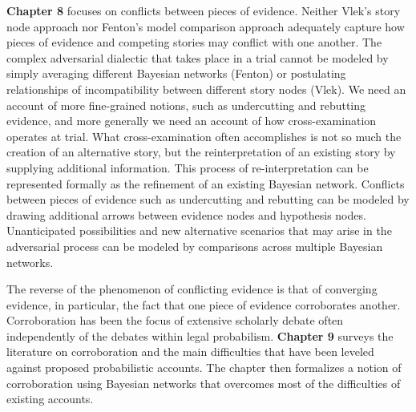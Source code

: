 \documentclass[
  10pt,
  dvipsnames,enabledeprecatedfontcommands]{scrartcl}
\begin{document}
\textbf{Chapter 8} focuses on conflicts between pieces of evidence.
Neither Vlek's story node approach nor Fenton's model comparison
approach adequately capture how pieces of evidence and competing stories
may conflict with one another. The complex adversarial dialectic that
takes place in a trial cannot be modeled by simply averaging different
Bayesian networks (Fenton) or postulating relationships of
incompatibility between different story nodes (Vlek). We need an account
of more fine-grained notions, such as undercutting and rebutting
evidence, and more generally we need an account of how cross-examination
operates at trial. What cross-examination often accomplishes is not so
much the creation of an alternative story, but the reinterpretation of
an existing story by supplying additional information. This process of
re-interpretation can be represented formally as the refinement of an
existing Bayesian network. Conflicts between pieces of evidence such as
undercutting and rebutting can be modeled by drawing additional arrows
between evidence nodes and hypothesis nodes. Unanticipated possibilities
and new alternative scenarios that may arise in the adversarial process
can be modeled by comparisons across multiple Bayesian networks.

The reverse of the phenomenon of conflicting evidence is that of
converging evidence, in particular, the fact that one piece of evidence
corroborates another. Corroboration has been the focus of extensive
scholarly debate often independently of the debates within legal
probabilism. \textbf{Chapter 9} surveys the literature on corroboration
and the main difficulties that have been leveled against proposed
probabilistic accounts. The chapter then formalizes a notion of
corroboration using Bayesian networks that overcomes most of the
difficulties of existing accounts.
\end{document}
